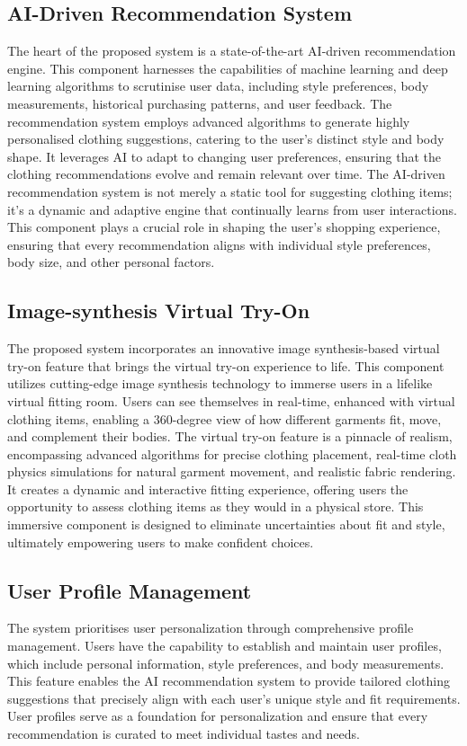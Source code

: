 	\subsection*{AI-Driven Recommendation System}
		The heart of the proposed system is a state-of-the-art AI-driven recommendation engine. This component harnesses the capabilities of machine learning and deep learning algorithms to scrutinise user data, including style preferences, body measurements, historical purchasing patterns, and user feedback. The recommendation system employs advanced algorithms to generate highly personalised clothing suggestions, catering to the user's distinct style and body shape. It leverages AI to adapt to changing user preferences, ensuring that the clothing recommendations evolve and remain relevant over time. The AI-driven recommendation system is not merely a static tool for suggesting clothing items; it's a dynamic and adaptive engine that continually learns from user interactions. This component plays a crucial role in shaping the user's shopping experience, ensuring that every recommendation aligns with individual style preferences, body size, and other personal factors.

	\subsection*{Image-synthesis Virtual Try-On}
        The proposed system incorporates an innovative image synthesis-based virtual try-on feature that brings the virtual try-on experience to life. This component utilizes cutting-edge image synthesis technology to immerse users in a lifelike virtual fitting room. Users can see themselves in real-time, enhanced with virtual clothing items, enabling a 360-degree view of how different garments fit, move, and complement their bodies. The virtual try-on feature is a pinnacle of realism, encompassing advanced algorithms for precise clothing placement, real-time cloth physics simulations for natural garment movement, and realistic fabric rendering. It creates a dynamic and interactive fitting experience, offering users the opportunity to assess clothing items as they would in a physical store. This immersive component is designed to eliminate uncertainties about fit and style, ultimately empowering users to make confident choices.

	\subsection*{User Profile Management}
		The system prioritises user personalization through comprehensive profile management. Users have the capability to establish and maintain user profiles, which include personal information, style preferences, and body measurements. This feature enables the AI recommendation system to provide tailored clothing suggestions that precisely align with each user's unique style and fit requirements. User profiles serve as a foundation for personalization and ensure that every recommendation is curated to meet individual tastes and needs.

